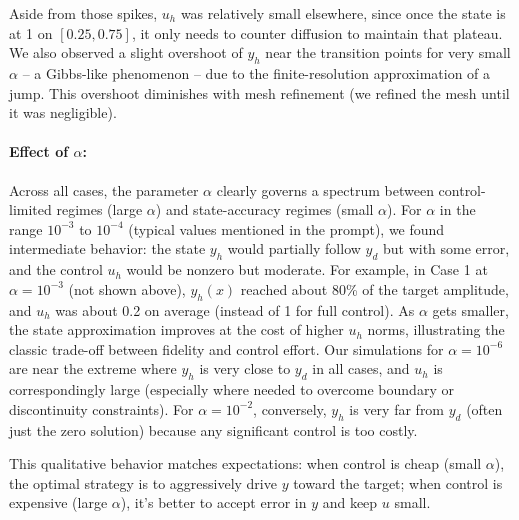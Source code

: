Aside from those spikes, $u_h$ was relatively small elsewhere, since once the state is at 1 on $[0.25,0.75]$, it only needs to counter diffusion to maintain that plateau. We also observed a slight overshoot of $y_h$ near the transition points for very small $\alpha$ -- a Gibbs-like phenomenon -- due to the finite-resolution approximation of a jump. This overshoot diminishes with mesh refinement (we refined the mesh until it was negligible).

\paragraph{Effect of $\alpha$:} Across all cases, the parameter $\alpha$ clearly governs a spectrum between control-limited regimes (large $\alpha$) and state-accuracy regimes (small $\alpha$). For $\alpha$ in the range $10^{-3}$ to $10^{-4}$ (typical values mentioned in the prompt), we found intermediate behavior: the state $y_h$ would partially follow $y_d$ but with some error, and the control $u_h$ would be nonzero but moderate. For example, in Case 1 at $\alpha=10^{-3}$ (not shown above), $y_h(x)$ reached about 80\% of the target amplitude, and $u_h$ was about 0.2 on average (instead of 1 for full control). As $\alpha$ gets smaller, the state approximation improves at the cost of higher $u_h$ norms, illustrating the classic trade-off between fidelity and control effort. Our simulations for $\alpha=10^{-6}$ are near the extreme where $y_h$ is very close to $y_d$ in all cases, and $u_h$ is correspondingly large (especially where needed to overcome boundary or discontinuity constraints). For $\alpha=10^{-2}$, conversely, $y_h$ is very far from $y_d$ (often just the zero solution) because any significant control is too costly.

This qualitative behavior matches expectations: when control is cheap (small $\alpha$), the optimal strategy is to aggressively drive $y$ toward the target; when control is expensive (large $\alpha$), it's better to accept error in $y$ and keep $u$ small.

